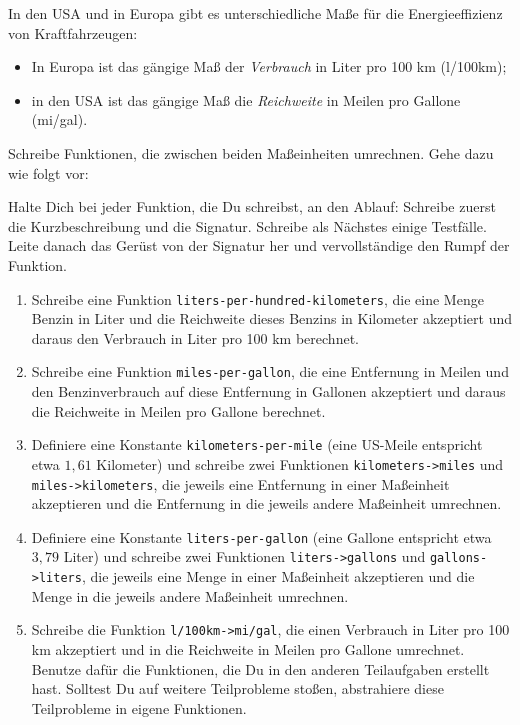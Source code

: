 \begin{aufgabe}

  In den USA und in Europa gibt es unterschiedliche
  Maße für die Energieeffizienz von Kraftfahrzeugen:
  \begin{itemize}
  \item In Europa ist das gängige Maß der \emph{Verbrauch} in Liter
    pro 100 km (l/100km);
  \item in den USA ist das gängige Maß die \emph{Reichweite} in Meilen
    pro Gallone (mi/gal).
  \end{itemize}
  Schreibe Funktionen, die zwischen beiden Maßeinheiten
  umrechnen.  Gehe dazu wie folgt vor:

  Halte Dich bei jeder Funktion, die Du schreibst, an den
  Ablauf: Schreibe zuerst die Kurzbeschreibung
  und die Signatur.  Schreibe als Nächstes einige Testfälle.
  Leite danach das Gerüst von der Signatur her und vervollständige
  den Rumpf der Funktion.

  \begin{enumerate}

  \item Schreibe eine Funktion
    \lstinline{liters-per-hundred-kilometers}, die eine Menge Benzin in
    Liter und die Reichweite dieses Benzins in Kilometer akzeptiert
    und daraus den Verbrauch in Liter pro 100 km berechnet.

  \item Schreibe eine Funktion
    \lstinline{miles-per-gallon}, die eine Entfernung in Meilen und den
    Benzinverbrauch auf diese Entfernung in Gallonen akzeptiert und
    daraus die Reichweite in Meilen pro Gallone berechnet.

  \item Definiere eine Konstante
    \lstinline{kilometers-per-mile} (eine US-Meile entspricht etwa $1,61$
    Kilometer) und schreibe zwei Funktionen
    \lstinline{kilometers->miles} und \lstinline{miles->kilometers}, die
    jeweils eine Entfernung in einer Maßeinheit akzeptieren und die
    Entfernung in die jeweils andere Maßeinheit umrechnen.

  \item Definiere eine Konstante
    \lstinline{liters-per-gallon} (eine Gallone entspricht etwa $3,79$
    Liter) und schreibe zwei Funktionen \lstinline{liters->gallons}
    und \lstinline{gallons->liters}, die jeweils eine Menge in einer
    Maßeinheit akzeptieren und die Menge in die jeweils andere
    Maßeinheit umrechnen.

  \item Schreibe die Funktion
    \lstinline{l/100km->mi/gal}, die einen Verbrauch in Liter pro 100 km
    akzeptiert und in die Reichweite in Meilen pro Gallone umrechnet.
    Benutze dafür die Funktionen, die Du in den anderen
    Teilaufgaben erstellt hast.  Solltest Du auf weitere Teilprobleme
    stoßen, abstrahiere diese Teilprobleme in eigene Funktionen.


\end{enumerate}
\end{aufgabe}
